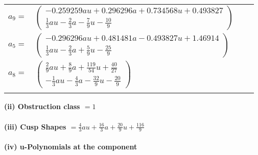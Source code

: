 \documentclass[1p]{elsarticle_modified}
\theoremstyle{definition}
\begin{document}
\begin{tabular}{m{7pt} m{180pt} m{7pt} m{180pt} }
\flushright $a_{9}=$&$\begin{pmatrix}-0.259259 a u+0.296296 a+0.734568 u+0.493827\\\frac{1}{3} a u-\frac{2}{3} a-\frac{7}{9} u-\frac{10}{9}\end{pmatrix}$ \\
\flushright $a_{5}=$&$\begin{pmatrix}-0.296296 a u+0.481481 a-0.493827 u+1.46914\\\frac{1}{3} a u-\frac{2}{3} a+\frac{5}{9} u-\frac{25}{9}\end{pmatrix}$ \\
\flushright $a_{8}=$&$\begin{pmatrix}\frac{2}{9} a u+\frac{8}{9} a+\frac{119}{54} u+\frac{40}{27}\\-\frac{1}{3} a u-\frac{4}{3} a-\frac{32}{9} u-\frac{20}{9}\end{pmatrix}$\\&\end{tabular}
\flushleft \textbf{(ii) Obstruction class $= 1$}\\~\\
\flushleft \textbf{(iii) Cusp Shapes $= \frac{4}{3} a u+\frac{16}{3} a+\frac{20}{9} u+\frac{116}{9}$}\\~\\
\newpage\renewcommand{\arraystretch}{1}
\flushleft \textbf{(iv) u-Polynomials at the component}\newline \\
\end{document}
